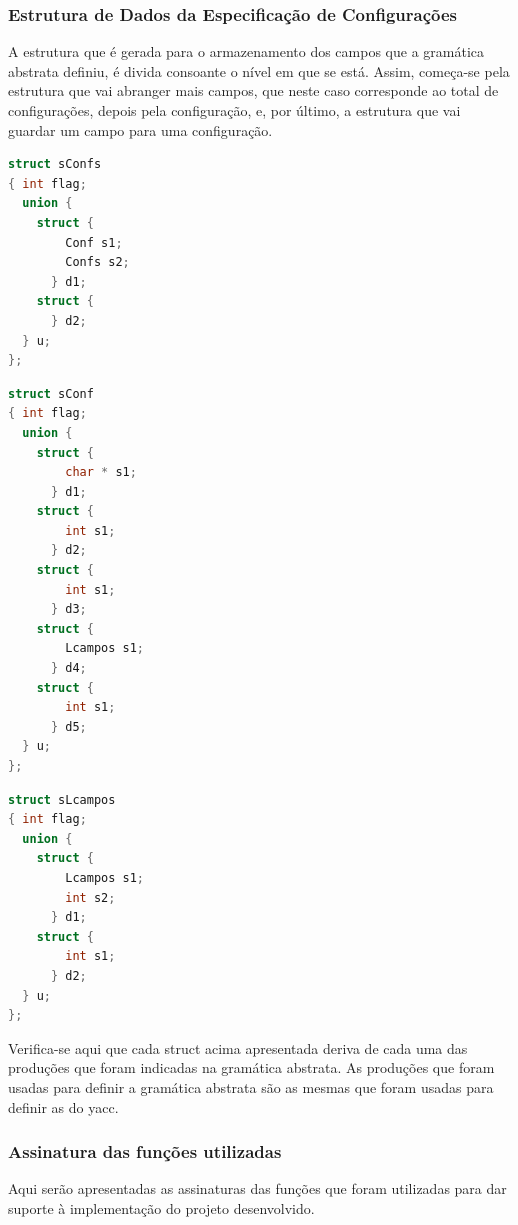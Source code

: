 \documentclass[11pt, a4paper, oneside]{article}
\begin{document}
\subsubsection{Estrutura de Dados da Especificação de Configurações}
A estrutura que é gerada para o armazenamento dos campos que a gramática abstrata definiu, é divida consoante o nível em que se está. Assim, começa-se pela estrutura que vai abranger mais campos, que neste caso corresponde ao total de configurações, depois pela configuração, e, por último, a estrutura que vai guardar um campo para uma configuração.

\begin{lstlisting}[language=C, caption={Estrutura de dados para armazenar as configurações.}]
struct sConfs 
{ int flag;
  union {  
    struct {
        Conf s1;
        Confs s2;
      } d1;
    struct {
      } d2;
  } u;
};
\end{lstlisting}
\newpage
\begin{lstlisting}[language=C, caption={Estrutura de dados que armazena uma configuração.}]
struct sConf 
{ int flag;
  union {  
    struct {
        char * s1;
      } d1;
    struct {
        int s1;
      } d2;
    struct {
        int s1;
      } d3;
    struct {
        Lcampos s1;
      } d4;
    struct {
        int s1;
      } d5;
  } u;
};
\end{lstlisting}

\begin{lstlisting}[language=C, caption={Estrututura de dados que armazena os campos de uma configuração.}]
struct sLcampos 
{ int flag;
  union {  
    struct {
        Lcampos s1;
        int s2;
      } d1;
    struct {
        int s1;
      } d2;
  } u;
};
\end{lstlisting}

Verifica-se aqui que cada \textsf{struct} acima apresentada deriva de cada uma das produções que foram indicadas na gramática abstrata.
As produções que foram usadas para definir a gramática abstrata são as mesmas que foram usadas para definir as do \textsf{yacc}.
\newpage

\subsubsection{Assinatura das funções utilizadas}
Aqui serão apresentadas as assinaturas das funções que foram utilizadas para dar suporte à implementação do projeto desenvolvido.
\end{document}
